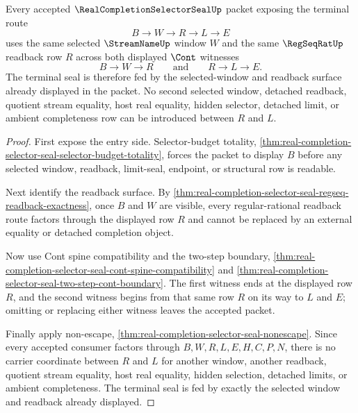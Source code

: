 \begin{theorem}
\label{thm:real-completion-selector-seal-window-tolerance-lock}
Every accepted $\RealCompletionSelectorSealUp$ packet exposing the terminal route
$$
B \to W \to R \to L \to E
$$
uses the same selected $\StreamNameUp$ window $W$ and the same $\RegSeqRatUp$ readback row $R$ across both displayed $\Cont$ witnesses
$$
B \to W \to R
\qquad\text{and}\qquad
R \to L \to E.
$$
The terminal seal is therefore fed by the selected-window and readback surface already displayed in the packet. No second selected window, detached readback, quotient stream equality, host real equality, hidden selector, detached limit, or ambient completeness row can be introduced between $R$ and $L$.
\end{theorem}
\begin{proof}
First expose the entry side. Selector-budget totality, \autoref{thm:real-completion-selector-seal-selector-budget-totality}, forces the packet to display $B$ before any selected window, readback, limit-seal, endpoint, or structural row is readable.

Next identify the readback surface. By \autoref{thm:real-completion-selector-seal-regseq-readback-exactness}, once $B$ and $W$ are visible, every regular-rational readback route factors through the displayed row $R$ and cannot be replaced by an external equality or detached completion object.

Now use Cont spine compatibility and the two-step boundary, \autoref{thm:real-completion-selector-seal-cont-spine-compatibility} and \autoref{thm:real-completion-selector-seal-two-step-cont-boundary}. The first witness ends at the displayed row $R$, and the second witness begins from that same row $R$ on its way to $L$ and $E$; omitting or replacing either witness leaves the accepted packet.

Finally apply non-escape, \autoref{thm:real-completion-selector-seal-nonescape}. Since every accepted consumer factors through $B,W,R,L,E,H,C,P,N$, there is no carrier coordinate between $R$ and $L$ for another window, another readback, quotient stream equality, host real equality, hidden selection, detached limits, or ambient completeness. The terminal seal is fed by exactly the selected window and readback already displayed.
\end{proof}

